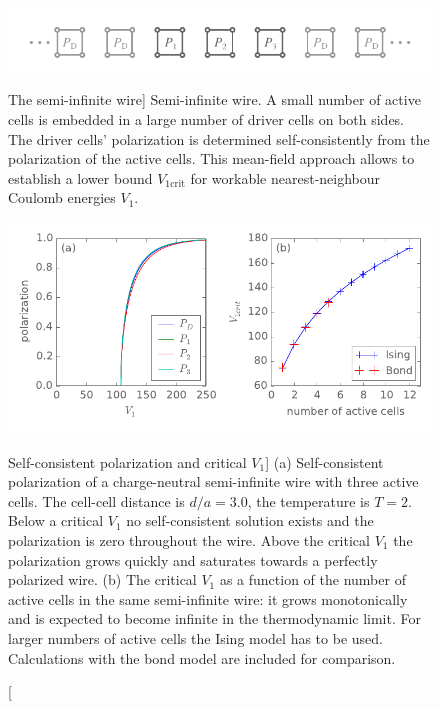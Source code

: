 \begin{figure}
  \center
  \includegraphics{semi_infinite_wire}
  \caption
  [The semi-infinite wire]
  {
  \label{fig:semi_infinite_wire}
  Semi-infinite wire. A small number of active cells is embedded in a large
  number of driver cells on both sides. The driver cells' polarization is
  determined self-consistently from the polarization of the active cells. This
  mean-field approach allows to establish a lower bound $V_{1\textrm{crit}}$ for workable
  nearest-neighbour Coulomb energies $V_1$.
  }
  
  \vspace*{0.75cm}
  
  \includegraphics{critical_V1}
  \caption
  [Self-consistent polarization and critical $V_1$]
  {
  \label{fig:critical_V1}
  (a) Self-consistent polarization of a charge-neutral semi-infinite wire with three active
  cells. The cell-cell distance is $d/a = 3.0$, the temperature is $T = 2$.
  Below a critical $V_1$ no self-consistent solution exists and the polarization
  is zero throughout the wire. Above the critical $V_1$ the polarization grows
  quickly and saturates towards a perfectly polarized wire.
  (b) The critical $V_1$ as a function of the number of active cells in the
  same semi-infinite wire: it grows monotonically and is expected to become infinite
  in the thermodynamic limit. For larger numbers of active cells the Ising model
  has to be used. Calculations with the bond model are included for comparison.
  }
\end{figure}

